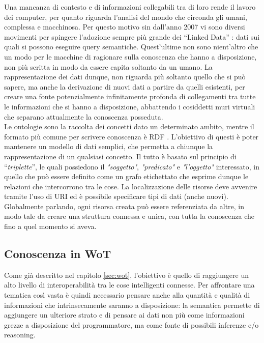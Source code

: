 \documentclass[12pt,a4paper,openright,oneside]{report}
\newcommand{\quotes}[1]{``#1''}
\begin{document}
Una mancanza di contesto e di informazioni collegabili tra di loro rende il lavoro dei computer, per quanto riguarda l'analisi del mondo che circonda gli umani, complessa e macchinosa. Per questo motivo sin dall'anno 2007 vi sono diversi movimenti per spingere l'adozione sempre più grande dei \quotes{Linked Data} \cite{linkeddata}: dati sui quali si possono eseguire query semantiche. Quest'ultime non sono nient'altro che un modo per le macchine di ragionare sulla conoscenza che hanno a disposizione, non più scritta in modo da essere capita soltanto da un umano. La rappresentazione dei dati dunque, non riguarda più soltanto quello che si può sapere, ma anche la derivazione di nuovi dati a partire da quelli esistenti, per creare una fonte potenzialmente infinitamente profonda di collegamenti tra tutte le informazioni che si hanno a disposizione, abbattendo i cosiddetti muri virtuali che separano attualmente la conoscenza posseduta.\\

Le ontologie \cite{ontology} sono la raccolta dei concetti dato un determinato ambito, mentre il formato più comune per scrivere conoscenza è RDF \cite{rdf}. L'obiettivo di questi è poter mantenere un modello di dati semplici, che permetta a chiunque la rappresentazione di un qualsiasi concetto. Il tutto è basato sul principio di \quotes{\textit{triplette}}, le quali possiedono il \textit{"soggetto"}, \textit{"predicato"} e \textit{"l'oggetto"} interessato, in quello che può essere definito come un grafo etichettato che esprime dunque le relazioni che intercorrono tra le cose. La localizzazione delle risorse deve avvenire tramite l'uso di URI ed è possibile specificare tipi di dati (anche nuovi). Globalmente parlando, ogni risorsa creata può essere referenziata da altre, in modo tale da creare una struttura connessa e unica, con tutta la conoscenza che fino a quel momento si aveva.

\subsection{Conoscenza in WoT}
Come già descritto nel capitolo \ref{sec:wot}, l'obiettivo è quello di raggiungere un alto livello di interoperabilità tra le cose intelligenti connesse. Per affrontare una tematica così vasta è quindi necessario pensare anche alla quantità e qualità di informazioni che intrinsecamente saranno a disposizione: la semantica permette di aggiungere un ulteriore strato e di pensare ai dati non più come informazioni grezze a disposizione del programmatore, ma come fonte di possibili inferenze e/o reasoning.\\
\end{document}
